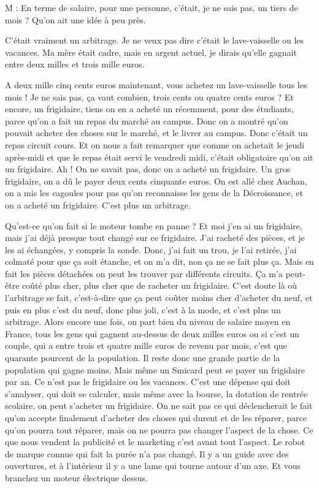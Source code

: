 \begin{description}
\vspace{1\baselineskip}

M : En terme de salaire, pour une personne, c'était, je ne sais pas, un tiers de mois ? Qu'on ait une idée à peu près.

\vspace{1\baselineskip}

C'était vraiment un arbitrage. Je ne veux pas dire c'était le lave-vaisselle ou les vacances. Ma mère était cadre, mais en argent actuel, je dirais qu'elle gagnait entre deux milles et trois mille euros. 

A deux mille cinq cents euros maintenant, vous achetez un lave-vaisselle tous les mois ! Je ne sais pas, ça vaut combien, trois cents ou quatre cents euros ? Et encore, un frigidaire, tiens on en a acheté un récemment, pour des étudiants, parce qu’on a fait un repas du marché au campus. Donc on a montré qu'on pouvait acheter des choses sur le marché, et le livrer au campus. Donc c'était un repas circuit cours. Et on nous a fait remarquer que comme on achetait le jeudi après-midi  et que le repas était servi le vendredi midi, c'était obligatoire qu'on ait un frigidaire. Ah ! On ne savait pas, donc on a acheté un frigidaire. Un gros frigidaire, on a dû le payer deux cents cinquante euros. On est allé chez Auchan, on a mis les cagoules pour pas qu'on reconnaisse les gens de la Décroissance, et on a acheté un frigidaire. C'est plus un arbitrage. 

Qu'est-ce qu'on fait si le moteur tombe en panne ? Et moi j'en ai un frigidaire, mais j'ai déjà presque tout changé sur ce frigidaire. J'ai racheté des pièces, et je les ai échangées, y compris la sonde. Donc, j'ai fait un trou, je l'ai retirée, j'ai colmaté pour que ça soit étanche, et on m'a dit, non ça ne se fait plus ça. Mais en fait les pièces détachées on peut les trouver par différents circuits. Ça m'a peut-être coûté plus cher, plus cher que de racheter un frigidaire. C'est doute là où l'arbitrage se fait, c'est-à-dire que ça peut coûter moins cher d'acheter du neuf, et puis en plus c'est du neuf, donc plus joli, c'est à la mode, et c'est plus un arbitrage. Alors encore une fois, on part bien du niveau de salaire moyen en France, tous les gens qui gagnent au-dessus de deux milles euros ou si c'est un couple, qui a entre trois et quatre mille euros de revenu par mois, c'est que quarante pourcent de la population. Il reste donc une grande partie de la population qui gagne moins. Mais même un Smicard peut se payer un frigidaire par an. Ce n'est pas le frigidaire ou les vacances. C'est une dépense qui doit s'analyser, qui doit se calculer, mais même avec la bourse, la dotation de rentrée scolaire, on peut s'acheter un frigidaire. On ne sait pas ce qui déclencherait le fait qu'on accepte finalement d'acheter des choses qui durent et de les réparer, parce qu'on pourra tout réparer, mais on ne pourra pas changer l'aspect de la chose. Ce que nous vendent la publicité et le marketing c'est avant tout l'aspect. Le robot de marque connue qui fait la purée n'a pas changé. Il y a un guide avec des ouvertures, et à l'intérieur il y a une lame qui tourne autour d'un axe. Et vous branchez un moteur électrique dessus.


\end{description}
